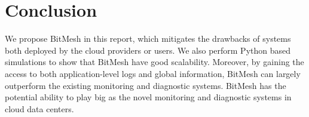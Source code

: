 \documentclass[11px]{article}
\newcommand{\projTitle}{BitMesh\xspace}
\begin{document}
\section{Conclusion}
We propose \projTitle in this report, which mitigates the drawbacks of systems both deployed by the cloud providers or users. We also perform Python based simulations to show that \projTitle have good scalability. Moreover, by gaining the access to both application-level logs and global information, \projTitle can largely outperform the existing monitoring and diagnostic systems. \projTitle has the potential ability to play big as the novel monitoring and diagnostic systems in cloud data centers.

\newpage


\end{document}
